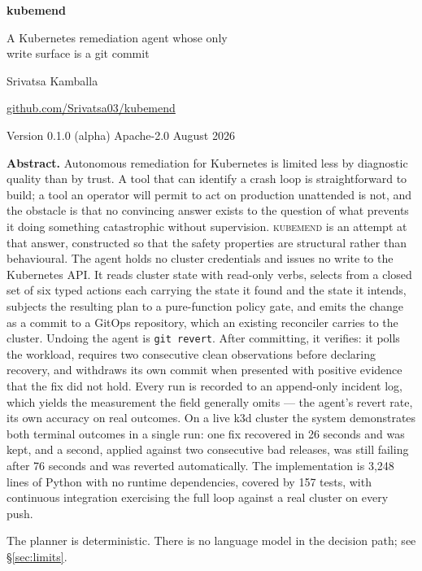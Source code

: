 \documentclass[11pt,a4paper]{article}
\newcommand{\code}[1]{\texttt{\small #1}}
\newcommand{\kubemend}{\textsc{kubemend}}
\begin{document}
\begin{titlepage}
\centering
\vspace*{2.2cm}

{\sffamily\Huge\bfseries kubemend\par}
\vspace{0.7cm}
{\sffamily\Large A Kubernetes remediation agent whose only\\[2pt]
write surface is a git commit\par}

\vspace{1.6cm}
{\large Srivatsa Kamballa\par}
\vspace{0.3cm}
{\small \href{https://github.com/Srivatsa03/kubemend}{github.com/Srivatsa03/kubemend}\par}
\vspace{0.2cm}
{\small Version 0.1.0 (alpha) \quad\textbullet\quad Apache-2.0 \quad\textbullet\quad August 2026\par}

\vspace{1.8cm}
\begin{minipage}{0.86\textwidth}
\small
\noindent\textbf{Abstract.}
Autonomous remediation for Kubernetes is limited less by diagnostic quality than
by trust. A tool that can identify a crash loop is straightforward to build; a
tool an operator will permit to act on production unattended is not, and the
obstacle is that no convincing answer exists to the question of what prevents it
doing something catastrophic without supervision. \kubemend{} is an attempt at
that answer, constructed so that the safety properties are structural rather
than behavioural. The agent holds no cluster credentials and issues no write to
the Kubernetes API. It reads cluster state with read-only verbs, selects from a
closed set of six typed actions each carrying the state it found and the state
it intends, subjects the resulting plan to a pure-function policy gate, and
emits the change as a commit to a GitOps repository, which an existing
reconciler carries to the cluster. Undoing the agent is \code{git revert}.
After committing, it verifies: it polls the workload, requires two consecutive
clean observations before declaring recovery, and withdraws its own commit when
presented with positive evidence that the fix did not hold. Every run is
recorded to an append-only incident log, which yields the measurement the field
generally omits --- the agent's revert rate, its own accuracy on real outcomes.
On a live k3d cluster the system demonstrates both terminal outcomes in a single
run: one fix recovered in 26 seconds and was kept, and a second, applied against
two consecutive bad releases, was still failing after 76 seconds and was
reverted automatically. The implementation is 3{,}248 lines of Python with no
runtime dependencies, covered by 157 tests, with continuous integration
exercising the full loop against a real cluster on every push.
\end{minipage}

\vfill
{\footnotesize The planner is deterministic. There is no language model in the decision path;
see \S\ref{sec:limits}.\par}
\end{titlepage}
\end{document}
